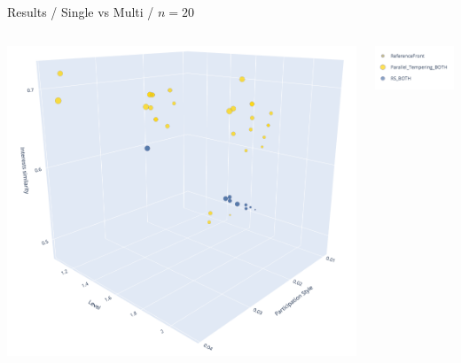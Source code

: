 \documentclass{beamer}
\begin{document}
    
    \begin{frame}{Results / Single vs Multi / $n=20$}
            \begin{columns}
                \begin{column}{0.70\textwidth}
                    \includegraphics[width=\textwidth]{images/20_both.png}
                \end{column}
                \begin{column}{0.30\textwidth}
                    \includegraphics[width=\textwidth]{images/legend_both.png}
                \end{column}
            \end{columns}\\
    \end{frame}
    
\end{document}
